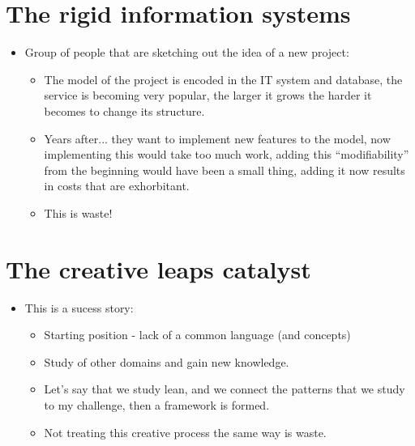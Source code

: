 \section{The rigid information systems}
\begin{itemize}
    \item Group of people that are sketching out the idea of a new project:
        \begin{itemize}
            \item The model of the project is encoded in the IT system and database, the service is becoming very popular, the larger it grows the harder it becomes to change its structure.
            \item Years after... they want to implement new features to the model, now implementing this would take too much work, adding this ``modifiability'' from the beginning would have been a small thing, adding it now results in costs that are exhorbitant.
            \item This is waste! 
        \end{itemize}
\end{itemize}



\section{The creative leaps catalyst}
\begin{itemize}
    \item This is a sucess story: 
        \begin{itemize}
            \item Starting position - lack of a common language (and concepts) 
            \item Study of other domains and gain new knowledge.
            \item Let's say that we study lean, and we connect the patterns that we study to my challenge, then a framework is formed.
            \item Not treating this creative process the same way is waste.
        \end{itemize}
\end{itemize}


